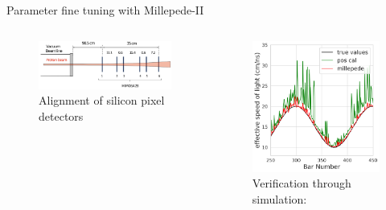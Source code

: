 \documentclass{ikpKoeln}
\begin{document}
\begin{frame}[t]{Parameter fine tuning with Millepede-II}
\begin{columns}[t]
\begin{column}{0.45 \textwidth}
			\begin{figure}
				\vspace{-0.5em}
				\includegraphics[width =\textwidth]{DPG2025/SilliconPixel.png}
				\caption*{Alignment of silicon pixel detectors }
			\end{figure}
			\vspace{-2.2em}
		\end{column}
		\begin{column}{0.45 \textwidth}
			\pause
			\begin{figure}
				\captionsetup{singlelinecheck=off}
				\caption*{Verification through simulation:}
				\vspace{-0.5em}
				\includegraphics[width = \textwidth]{DPG2025/sim_comp_c.png}
			\end{figure}
		\end{column}
	\end{columns}
\end{frame}
\end{document}
